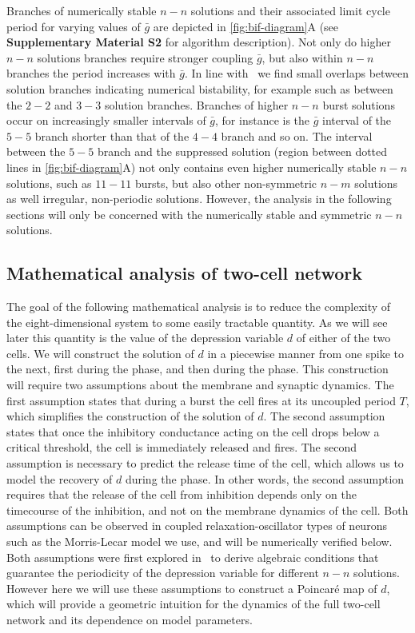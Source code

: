 Branches of numerically stable $n-n$ solutions and their associated limit cycle period for varying values of $\bar g$ are depicted in \cref{fig:bif-diagram}A (see \textbf{Supplementary Material S2} for algorithm description).
Not only do higher $n-n$ solutions branches require stronger coupling $\bar g$, but also within $n-n$ branches the period increases with $\bar g$.
In line with~\citet{bose2011} we find small overlaps between solution branches indicating numerical bistability, for example such as between the $2-2$ and $3-3$ solution branches.
Branches of higher $n-n$ burst solutions occur on increasingly smaller intervals of $\bar g$, for instance is the $\bar g$ interval of the $5-5$ branch shorter than that of the $4-4$ branch and so on.
The interval between the $5-5$ branch and the suppressed solution (region between dotted lines in \cref{fig:bif-diagram}A) not only contains even higher numerically stable $n-n$ solutions, such as $11-11$ bursts, but also other non-symmetric $n-m$ solutions as well irregular, non-periodic solutions.
However, the analysis in the following sections will only be concerned with the numerically stable and symmetric $n-n$ solutions.

\subsection{Mathematical analysis of two-cell network}
\label{sec:assumptions}
The goal of the following mathematical analysis is to reduce the complexity of the
eight-dimensional system to some easily tractable quantity.
As we will see later this quantity is the value of the depression variable $d$ of either of the two cells.
We will construct the solution of $d$ in a piecewise manner from one spike to the next, first during the \free{} phase, and then during the \suppressed{} phase.
This construction will require two assumptions about the membrane and synaptic dynamics.
The first assumption states that during a burst the \free{} cell fires at its uncoupled period $T$, which simplifies the construction of the solution of $d$.
The second assumption states that once the inhibitory conductance acting on the \suppressed{} cell drops below a critical threshold, the cell is immediately released and fires.
The second assumption is necessary to predict the release time of the \suppressed{} cell, which allows us to model the recovery of $d$ during the \suppressed{} phase.
In other words, the second assumption requires that the release of the \suppressed{} cell from inhibition depends only on the timecourse of the inhibition, and not on the membrane dynamics of the \suppressed{} cell.
Both assumptions can be observed in coupled relaxation-oscillator types of neurons such as the Morris-Lecar model we use, and will be numerically verified below.
Both assumptions were first explored in~\cite{bose2011} to derive algebraic conditions that guarantee the periodicity of the depression variable for different $n-n$ solutions.
However here we will use these assumptions to construct a Poincaré map of $d$, which will provide a geometric intuition for the dynamics of the full two-cell network and its dependence on model parameters.

